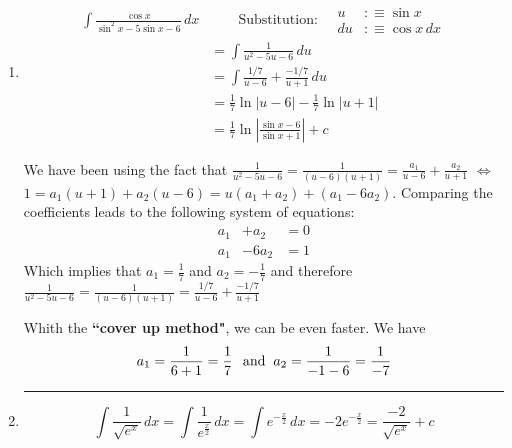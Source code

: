 \begin{enumerate}
  \item
    \begin{equation}
      \begin{aligned}
        \int \frac{\cos x}{\sin^2 x - 5 \sin x - 6} \, dx
        & \qquad
        \text{Substitution:}
        \quad
        \boxed{\begin{aligned}
            u  &:\equiv \sin x \\
            du &: \equiv \cos x \, dx
          \end{aligned}
        } \\
        & = \int \frac{1}{u^2-5u-6} \, du \\
        & = \int \frac{1/7}{u-6}+\frac{-1/7}{u+1} \, du \\
        & = \frac{1}{7} \ln |u-6| - \frac{1}{7} \ln |u+1| \\
        & = \frac{1}{7} \ln \left | \frac{ \sin x - 6} {\sin x + 1} \right | + c
      \end{aligned}
    \end{equation}

    We have been using the fact that $\frac{1}{u^2-5u-6}=\frac{1}{(u-6)(u+1)}=\frac{a_1}{u-6}+\frac{a_2}{u+1}$ $\iff$ $1=a_1 (u+1) + a_2(u-6)=u(a_1+a_2)+(a_1-6a_2)$. Comparing the coefficients leads to the following system of equations:
    \begin{equation}
      \begin{aligned}
        a_1 & +   a_2 & = 0 \\
        a_1 & - 6 a_2 & = 1
      \end{aligned}
    \end{equation}
    Which implies that $a_1 = \frac{1}{7}$ and $a_2 = -\frac{1}{7}$ and therefore $\frac{1}{u^2-5u-6}=\frac{1}{(u-6)(u+1)}=\frac{1/7}{u-6}+\frac{-1/7}{u+1}$

    Whith the \textbf{``cover up method"}, we can be even faster. We have \\
    \begin{equation}
      a_1 = \frac{1}{6+1} = \frac{1}{7} \;\;\, \text{and}\;\; a_2 = \frac{1}{-1-6} = \frac{1}{-7}
    \end{equation}
    \bigbreak
    \hrule
    \bigbreak

  \item
  \begin{equation}
    \int \frac{1}{\sqrt{e^x}} \,dx
     = \int \frac{1}{e^{\frac{x}{2}}} \, dx
     = \int e^{-\frac{x}{2}} \, dx
     = -2 e^{-\frac{x}{2}} = \frac{-2}{\sqrt{e^x}}+c
  \end{equation}

\end{enumerate}